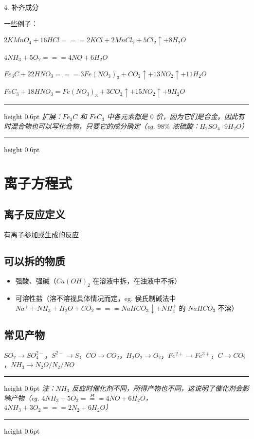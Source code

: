 \documentclass[UTF8,zihao=-4,openany]{ctexbook}
\newenvironment{notebox}
  {\par\smallskip\noindent\begingroup\begin{minipage}{\linewidth}\color{noteframe}\hrule height 0.6pt\smallskip\color{black}\itshape}
  {\par\smallskip\color{noteframe}\hrule height 0.6pt\end{minipage}\endgroup\par\smallskip}
\begin{document}
4. 补齐成分\par

一些例子：\par

$2KMnO_4+16HCl=\!=\!= 2KCl+2MnCl_2+5Cl_2 \uparrow +8H_2O$\par

$4NH_3+5O_2 =\!=\!= 4NO+6H_2O$\par

$Fe_3C+22HNO_3 =\!=\!= 3Fe(NO_3)_3+CO_2\uparrow+13NO_2\uparrow+11H_2O$\par

$FeC_3+18HNO_3=Fe(NO_3)_3+3CO_2\uparrow+15NO_2\uparrow+9H_2O$\par
\begin{notebox}
扩展：$Fe_3C$ 和 $FeC_3$ 中各元素都是 $0$ 价，因为它们是合金。因此有时混合物也可以写化合物，只要它的成分确定（eg. $98\%$ 浓硫酸：$H_2SO_4\cdot 9H_2O$）\par
\end{notebox}
\section{离子方程式}
\subsection{离子反应定义}
有离子参加或生成的反应\par
\subsection{可以拆的物质}
\begin{itemize}
\item 强酸、强碱（$Ca(OH)_2$ 在溶液中拆，在浊液中不拆）
\end{itemize}

\begin{itemize}
\item 可溶性盐（溶不溶视具体情况而定，eg. 侯氏制碱法中 $Na^++NH_3+H_2O+CO_2=\!=\!=NaHCO_3\downarrow+NH_4^+$ 的 $NaHCO_3$ 不溶）
\end{itemize}
\subsection{常见产物}
$SO_2\to SO_4^{2-}$，$S^{2-}\to S$，$CO\to CO_2$，$H_2O_2\to O_2$，$Fe^{2+}\to Fe^{3+}$，$C\to CO_2$，$NH_3\to N_2O/N_2/NO$\par
\begin{notebox}
注：$NH_3$ 反应时催化剂不同，所得产物也不同，这说明了催化剂会影响产物（eg. $4NH_3+5O_2\stackrel{Pt}{=\!=\!=}4NO+6H_2O$，\\[0.25em]
\hspace*{2em}$4NH_3+3O_2=\!=\!=2N_2+6H_2O$）\par
\end{notebox}
\end{document}
